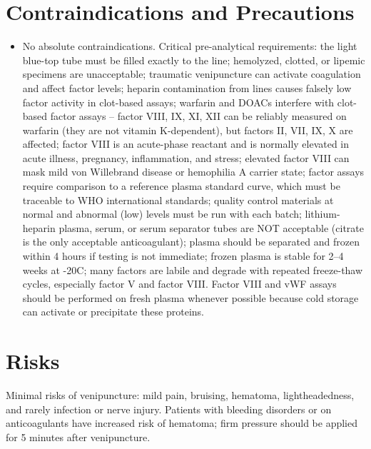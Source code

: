 \section*{Contraindications and Precautions}
\begin{itemize}
  \item No absolute contraindications. Critical pre-analytical requirements: the light blue-top tube must be filled exactly to the line; hemolyzed, clotted, or lipemic specimens are unacceptable; traumatic venipuncture can activate coagulation and affect factor levels; heparin contamination from lines causes falsely low factor activity in clot-based assays; warfarin and DOACs interfere with clot-based factor assays -- factor VIII, IX, XI, XII can be reliably measured on warfarin (they are not vitamin K-dependent), but factors II, VII, IX, X are affected; factor VIII is an acute-phase reactant and is normally elevated in acute illness, pregnancy, inflammation, and stress; elevated factor VIII can mask mild von Willebrand disease or hemophilia A carrier state; factor assays require comparison to a reference plasma standard curve, which must be traceable to WHO international standards; quality control materials at normal and abnormal (low) levels must be run with each batch; lithium-heparin plasma, serum, or serum separator tubes are NOT acceptable (citrate is the only acceptable anticoagulant); plasma should be separated and frozen within 4 hours if testing is not immediate; frozen plasma is stable for 2--4 weeks at -20\textdegree{}C; many factors are labile and degrade with repeated freeze-thaw cycles, especially factor V and factor VIII. Factor VIII and vWF assays should be performed on fresh plasma whenever possible because cold storage can activate or precipitate these proteins.
\end{itemize}
\section*{Risks}
Minimal risks of venipuncture: mild pain, bruising, hematoma, lightheadedness, and rarely infection or nerve injury. Patients with bleeding disorders or on anticoagulants have increased risk of hematoma; firm pressure should be applied for 5 minutes after venipuncture.

